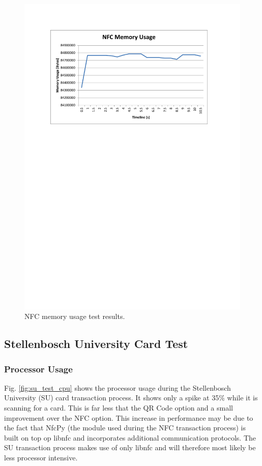 \begin{figure}
 \centering 
 \includegraphics[clip=true, trim = 0 510 0 70,
 scale=0.7]{nfc_test_mem}
 \caption{NFC memory usage test results.}
 \label{fig:nfc_test_mem}
\end{figure}

\subsection{Stellenbosch University Card Test}

\subsubsection{Processor Usage}

Fig. \ref{fig:su_test_cpu} shows the processor usage during the Stellenbosch University
(SU) card transaction process. It shows only a spike at 35\% while it is scanning for a
card. This is far less that the QR Code option and a small improvement over the NFC
option. This increase in performance may be due to the fact that NfcPy (the module used
during the NFC transaction process) is built on top op libnfc and incorporates additional
communication protocols. The SU transaction process makes use of only libnfc and will
therefore most likely be less processor intensive.

